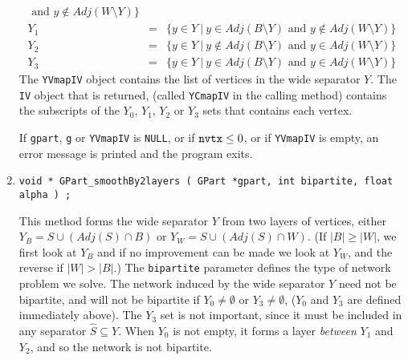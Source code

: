 \begin{enumerate}
\begin{eqnarray*}
            \mbox{\ and\ }
            y \notin Adj(W \setminus Y)
\} \\
Y_1 & = & \{y \in Y\ |\ 
            y \in Adj(B \setminus Y)
            \mbox{\ and\ }
            y \notin Adj(W \setminus Y)
\} \\
Y_2 & = & \{y \in Y\ |\ 
            y \notin Adj(B \setminus Y)
            \mbox{\ and\ }
            y \in Adj(W \setminus Y)
\} \\
Y_3 & = & \{y \in Y\ |\ 
            y \in Adj(B \setminus Y)
            \mbox{\ and\ }
            y \in Adj(W \setminus Y)
\}
\end{eqnarray*}
The {\tt YVmapIV} object contains the list of vertices in the wide
separator $Y$.
The {\tt IV} object that is returned, (called {\tt YCmapIV} in
the calling method) contains the subscripts of the $Y_0$, $Y_1$,
$Y_2$ or $Y_3$ sets that contains each vertex.
\par \noindent {\it Error checking:}
If {\tt gpart}, {\tt g} or {\tt YVmapIV} is {\tt NULL},
or if ${\tt nvtx} \le 0$,
or if {\tt YVmapIV} is empty,
an error message is printed and the program exits.
\item
\begin{verbatim}
void * GPart_smoothBy2layers ( GPart *gpart, int bipartite, float alpha ) ;
\end{verbatim}
This method forms the wide separator $Y$ from two layers of
vertices, either $Y_B = S \cup (Adj(S) \cap B)$ 
or $Y_W = S \cup (Adj(S) \cap W)$.
(If $|B| \ge |W|$, we first look at $Y_B$ and if no improvement can
be made we look at $Y_W$, and the reverse if $|W| > |B|$.)
The {\tt bipartite} parameter defines the type of network problem
we solve.
The network induced by the wide separator $Y$ need not be bipartite,
and will not be bipartite if $Y_0 \ne \emptyset$ or $Y_3 \ne \emptyset$,
($Y_0$ and $Y_3$ are defined immediately above).
The $Y_3$ set is not important, since it must be included in any
separator ${\widehat S} \subseteq Y$.
When $Y_0$ is not empty, it forms a layer {\it between} $Y_1$ and $Y_2$,
and so the network is not bipartite.

\end{enumerate}
